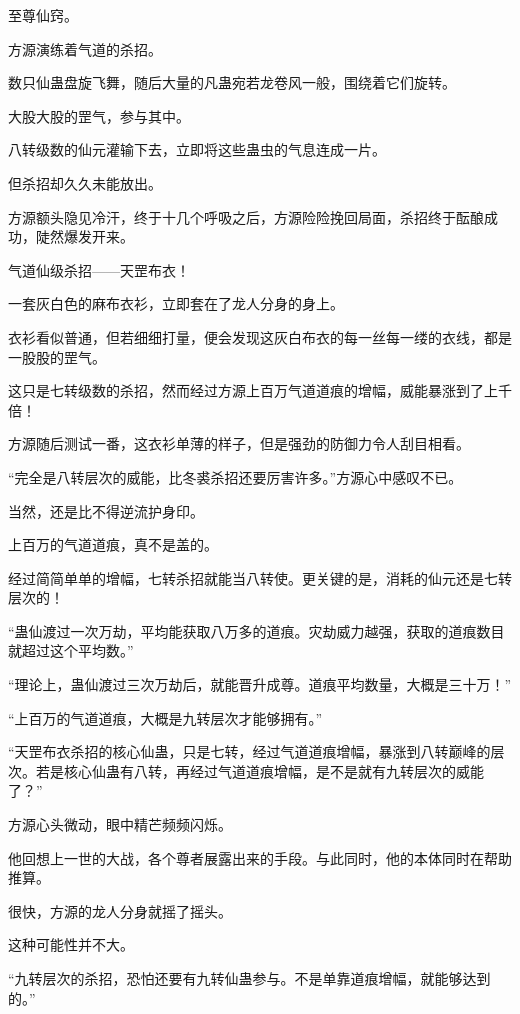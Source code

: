 
\begin{this_body}

至尊仙窍。

方源演练着气道的杀招。

数只仙蛊盘旋飞舞，随后大量的凡蛊宛若龙卷风一般，围绕着它们旋转。

大股大股的罡气，参与其中。

八转级数的仙元灌输下去，立即将这些蛊虫的气息连成一片。

但杀招却久久未能放出。

方源额头隐见冷汗，终于十几个呼吸之后，方源险险挽回局面，杀招终于酝酿成功，陡然爆发开来。

气道仙级杀招——天罡布衣！

一套灰白色的麻布衣衫，立即套在了龙人分身的身上。

衣衫看似普通，但若细细打量，便会发现这灰白布衣的每一丝每一缕的衣线，都是一股股的罡气。

这只是七转级数的杀招，然而经过方源上百万气道道痕的增幅，威能暴涨到了上千倍！

方源随后测试一番，这衣衫单薄的样子，但是强劲的防御力令人刮目相看。

“完全是八转层次的威能，比冬裘杀招还要厉害许多。”方源心中感叹不已。

当然，还是比不得逆流护身印。

上百万的气道道痕，真不是盖的。

经过简简单单的增幅，七转杀招就能当八转使。更关键的是，消耗的仙元还是七转层次的！

“蛊仙渡过一次万劫，平均能获取八万多的道痕。灾劫威力越强，获取的道痕数目就超过这个平均数。”

“理论上，蛊仙渡过三次万劫后，就能晋升成尊。道痕平均数量，大概是三十万！”

“上百万的气道道痕，大概是九转层次才能够拥有。”

“天罡布衣杀招的核心仙蛊，只是七转，经过气道道痕增幅，暴涨到八转巅峰的层次。若是核心仙蛊有八转，再经过气道道痕增幅，是不是就有九转层次的威能了？”

方源心头微动，眼中精芒频频闪烁。

他回想上一世的大战，各个尊者展露出来的手段。与此同时，他的本体同时在帮助推算。

很快，方源的龙人分身就摇了摇头。

这种可能性并不大。

“九转层次的杀招，恐怕还要有九转仙蛊参与。不是单靠道痕增幅，就能够达到的。”


\end{this_body}
